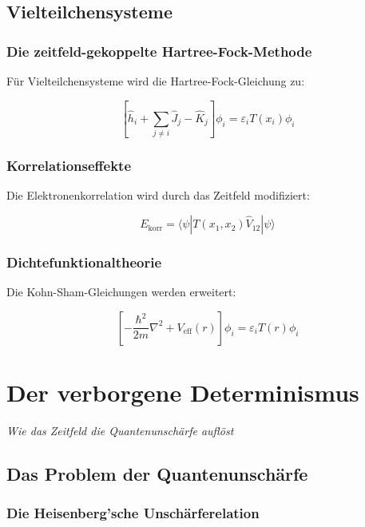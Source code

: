 \documentclass[12pt,a4paper]{report}
\begin{document}
\section{Vielteilchensysteme}

\subsection{Die zeitfeld-gekoppelte Hartree-Fock-Methode}

Für Vielteilchensysteme wird die Hartree-Fock-Gleichung zu:

\begin{equation}
	\left[\hat{h}_i + \sum_{j\neq i}\hat{J}_j - \hat{K}_j\right]\phi_i = \varepsilon_i T(x_i)\phi_i
\end{equation}

\subsection{Korrelationseffekte}

Die Elektronenkorrelation wird durch das Zeitfeld modifiziert:

\begin{equation}
	E_{\text{korr}} = \langle\psi|T(x_1,x_2)\hat{V}_{12}|\psi\rangle
\end{equation}

\subsection{Dichtefunktionaltheorie}

Die Kohn-Sham-Gleichungen werden erweitert:

\begin{equation}
	\left[-\frac{\hbar^2}{2m}\nabla^2 + V_{\text{eff}}(r)\right]\phi_i = \varepsilon_i T(r)\phi_i
\end{equation}

% 
	\chapter{Der verborgene Determinismus}
	\textit{Wie das Zeitfeld die Quantenunschärfe auflöst}
	
	\section{Das Problem der Quantenunschärfe}
	
	\subsection{Die Heisenberg'sche Unschärferelation}
	
\end{document}
